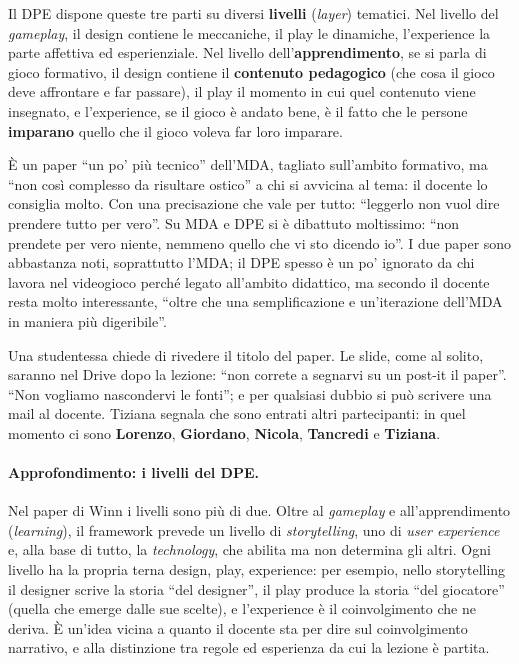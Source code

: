 Il DPE dispone queste tre parti su diversi \textbf{livelli} (\emph{layer})
tematici. Nel livello del \emph{gameplay}, il design contiene le meccaniche, il
play le dinamiche, l'experience la parte affettiva ed esperienziale. Nel livello
dell'\textbf{apprendimento}, se si parla di gioco formativo, il design contiene
il \textbf{contenuto pedagogico} (che cosa il gioco deve affrontare e far
passare), il play il momento in cui quel contenuto viene insegnato, e
l'experience, se il gioco è andato bene, è il fatto che le persone
\textbf{imparano} quello che il gioco voleva far loro imparare.

È un paper ``un po' più tecnico'' dell'MDA, tagliato sull'ambito formativo, ma
``non così complesso da risultare ostico'' a chi si avvicina al tema: il docente
lo consiglia molto. Con una precisazione che vale per tutto: ``leggerlo non vuol
dire prendere tutto per vero''. Su MDA e DPE si è dibattuto moltissimo: ``non
prendete per vero niente, nemmeno quello che vi sto dicendo io''. I due paper
sono abbastanza noti, soprattutto l'MDA; il DPE spesso è un po' ignorato da chi
lavora nel videogioco perché legato all'ambito didattico, ma secondo il docente
resta molto interessante, ``oltre che una semplificazione e un'iterazione
dell'MDA in maniera più digeribile''.

Una studentessa chiede di rivedere il titolo del paper. Le slide, come al solito,
saranno nel Drive dopo la lezione: ``non correte a segnarvi su un post-it il
paper''. ``Non vogliamo nascondervi le fonti''; e per qualsiasi dubbio si può
scrivere una mail al docente. Tiziana segnala che sono entrati altri
partecipanti: in quel momento ci sono \textbf{Lorenzo}, \textbf{Giordano},
\textbf{Nicola}, \textbf{Tancredi} e \textbf{Tiziana}.

\paragraph{Approfondimento: i livelli del DPE.} Nel paper di Winn i livelli
sono più di due. Oltre al \emph{gameplay} e all'apprendimento
(\emph{learning}), il framework prevede un livello di \emph{storytelling}, uno
di \emph{user experience} e, alla base di tutto, la \emph{technology}, che
abilita ma non determina gli altri. Ogni livello ha la propria terna design,
play, experience: per esempio, nello storytelling il designer scrive la storia
``del designer'', il play produce la storia ``del giocatore'' (quella che
emerge dalle sue scelte), e l'experience è il coinvolgimento che ne deriva. È
un'idea vicina a quanto il docente sta per dire sul coinvolgimento narrativo, e
alla distinzione tra regole ed esperienza da cui la lezione è partita.

